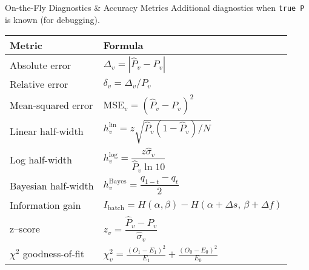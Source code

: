 \begin{frame}{On-the-Fly Diagnostics \& Accuracy Metrics}
\footnotesize
Additional diagnostics when \texttt{true P} is known (for debugging).
\centering
\begin{tabular}{l l}
\toprule
\textbf{Metric} & \textbf{Formula}\\
\midrule
Absolute error & $\Delta_v = |\widehat P_v-P_v|$\\[2pt]
Relative error & $\delta_v = \Delta_v / P_v$\\[2pt]
Mean-squared error & $\text{MSE}_v =(\widehat P_v-P_v)^2$\\[2pt]
Linear half-width & $h^{\text{lin}}_v = z\sqrt{\widehat P_v(1-\widehat P_v)/N}$\\[2pt]
Log half-width & $h^{\log}_v = \dfrac{z\widehat \sigma_v}{\widehat P_v\ln 10}$\\[2pt]
Bayesian half-width & $h^{\text{Bayes}}_v = \dfrac{q_{1-t}-q_t}{2}$\\[2pt]
Information gain & $I_{\text{batch}} = H(\alpha,\beta)-H(\alpha+\Delta s,\,\beta+\Delta f)$\\[2pt]
z--score & $z_v = \dfrac{\widehat P_v-P_v}{\widehat \sigma_v}$\\[2pt]
$\chi^{2}$ goodness-of-fit & $\chi^{2}_v = \frac{(O_1-E_1)^2}{E_1}+\frac{(O_0-E_0)^2}{E_0}$\\
\bottomrule
\end{tabular}
\end{frame}
